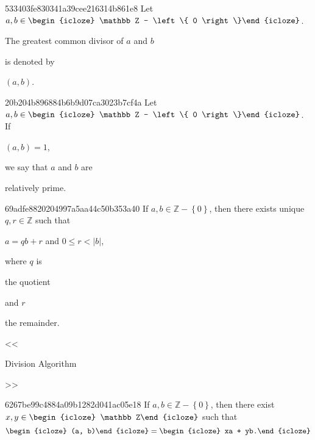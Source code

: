 \begin{note}{533403fe830341a39cee216314b861e8}
    Let \({ a, b \in \begin{icloze}{3}\mathbb Z - \left\{ 0 \right\}\end{icloze} }\).
    \begin{icloze}{2}The greatest common divisor of \({ a }\) and \({ b }\)\end{icloze} is denoted by \begin{icloze}{1}\({ (a, b) }\).\end{icloze}
\end{note}

\begin{note}{20b204b896884b6b9d07ca3023b7cf4a}
    Let \({ a, b \in \begin{icloze}{3}\mathbb Z - \left\{ 0 \right\}\end{icloze} }\).
    If \begin{icloze}{2}\({ (a, b) = 1 }\),\end{icloze} we say that \({ a }\) and \({ b }\) are \begin{icloze}{1}relatively prime.\end{icloze}
\end{note}

\begin{note}{69adfe8820204997a5aa44c50b353a40}
    If \({ a, b \in \mathbb Z - \left\{ 0 \right\} }\), then there exists unique \({ q, r \in \mathbb Z }\) such that
    \begin{center}
        \({ a = q b + r }\) and \({ 0 \leqslant r < \left\lvert b \right\rvert }\),
    \end{center}
    where \({ q }\) is \begin{icloze}{1}the quotient\end{icloze} and \({ r }\) \begin{icloze}{1}the remainder.\end{icloze}

    \begin{center}
        \tiny
        <<\begin{icloze}{2}Division Algorithm\end{icloze}>>
    \end{center}
\end{note}

\begin{note}{6267be99c4884a09b1282d041ac05e18}
    If \({ a, b \in \mathbb Z - \left\{ 0 \right\} }\), then there exist \({ x, y \in \begin{icloze}{3}\mathbb Z\end{icloze} }\) such that
    \[
        \begin{icloze}{2}(a, b)\end{icloze} = \begin{icloze}{1}xa + yb.\end{icloze}
    \]
\end{note}

